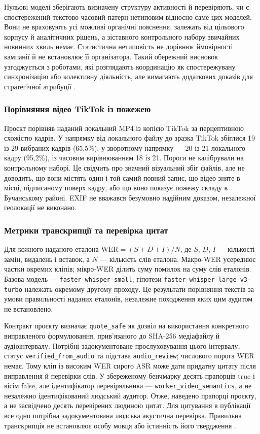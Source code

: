 Нульові моделі зберігають визначену структуру активності й перевіряють, чи є спостережений текстово-часовий патерн нетиповим відносно саме цих моделей. Вони не враховують усі можливі органічні пояснення, залежать від цільового корпусу й аналітичних рішень, а зіставного контрольного набору звичайних новинних хвиль немає. Статистична нетиповість не дорівнює ймовірності кампанії й не встановлює її організатора. Такий обережний висновок узгоджується з роботами, які розглядають координацію як спостережувану синхронізацію або колективну діяльність, але вимагають додаткових доказів для стратегічної атрибуції \citep{starbird2019collaborative,pacheco2021uncovering,nizzoli2021coordinated,magelinski2022synchronized,ng2023combined}.

\subsubsection{Порівняння відео TikTok із пожежею}

Проєкт порівняв наданий локальний MP4 із копією TikTok за перцептивною схожістю кадрів. У напрямку від локального файлу до зразка TikTok збіглися 19 із 29 вибраних кадрів (65,5\%); у зворотному напрямку — 20 із 21 локального кадру (95,2\%), із часовим вирівнюванням 18 із 21. Пороги не калібрували на контрольному наборі. Це свідчить про значний візуальний збіг файлів, але не доводить, що вони містять один і той самий повний запис, що відео зняте в місці, підписаному поверх кадру, або що воно показує пожежу складу в Бучанському районі. EXIF не вважався безумовно надійним доказом, незалежної геолокації не виконано.

\subsubsection{Метрики транскрипції та перевірка цитат}

Для кожного наданого еталона $\mathrm{WER}=(S+D+I)/N$, де $S$, $D$, $I$ — кількості замін, видалень і вставок, а $N$ — кількість слів еталона. Макро-WER усереднює частки окремих кліпів; мікро-WER ділить суму помилок на суму слів еталонів. Базова модель — \texttt{faster-whisper-small}; гіпотези \texttt{faster-whisper-large-v3-turbo} належать окремому другому проходу. Це результати порівняння текстів за умови правильності наданих еталонів, незалежне походження яких цим аудитом не встановлено.

Контракт проєкту визначає \texttt{quote\_safe} як дозвіл на використання конкретного виправленого формулювання, прив'язаного до SHA-256 медіафайлу й аудіоінтервалу. Потрібні задокументоване прослуховування цього інтервалу, статус \texttt{verified\_from\_audio} та підстава \texttt{audio\_review}; числового порога WER немає. Тому кліп із високим WER сирого ASR може дати придатну цитату після виправлення й перевірки слів. У збереженому бенчмарку десять прапорців true і вісім false, але ідентифікатор перевіряльника — \texttt{worker\_video\_semantics}, а не незалежно ідентифікований людський аудитор. Отже, наведено прапорці проєкту, а не засвідчено десять перевірених людиною цитат. Для цитування в публікації все одно потрібна задокументована людська акустична перевірка. Правильна транскрипція не встановлює особу мовця або істинність його твердження \citep{socialasr2026}.

